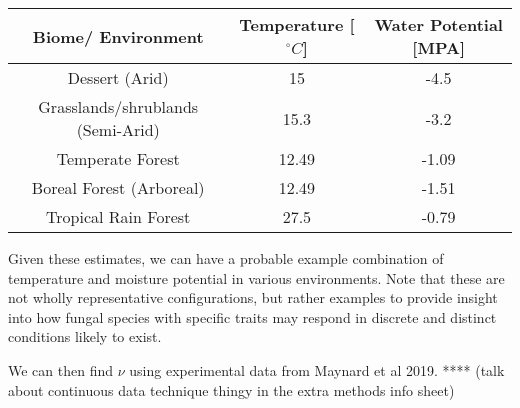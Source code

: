 \documentclass[12pt]{article}
\begin{document}
\begin{table}[H]
	\begin{center}
		\begin{tabular}{|c c c|} 
			\hline
			Biome/ Environment & Temperature [$^{\circ}C$] & Water Potential [MPA]\\ [0.5ex] 
			\hline\hline
			Dessert (Arid) & 15 & -4.5 \\ 
			\hline
			Grasslands/shrublands (Semi-Arid) &15.3 & -3.2\\
			\hline
			Temperate Forest & 12.49 & -1.09 \\
			\hline
			Boreal Forest (Arboreal)& 12.49 &  -1.51 \\
			\hline
			Tropical Rain Forest & 27.5 & -0.79 \\
			\hline
		\end{tabular}
	\end{center}
\end{table}


Given these estimates, we can have a probable example combination of temperature and moisture potential in various environments. Note that these are not wholly representative configurations, but rather examples to provide insight into how fungal species with specific traits may respond in discrete and distinct conditions likely to exist. 

We can then find $\nu$ using experimental data from Maynard et al 2019. **** (talk about continuous data technique thingy in the extra methods info sheet)
\end{document}
